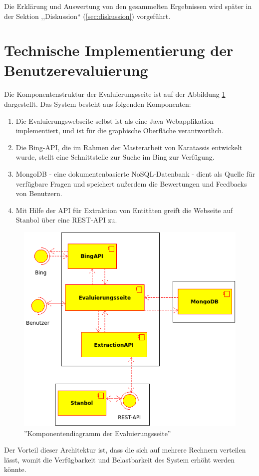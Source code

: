 Die Erklärung und Auswertung von den gesammelten Ergebnissen wird später in der Sektion ,,Diskussion`` (\ref{sec:diskussion}) vorgeführt. 

\section{Technische Implementierung der Benutzerevaluierung}
\paragraph{}
Die Komponentenstruktur der Evaluierungsseite ist auf der Abbildung \ref{fig:evalcomponents} dargestellt. Das System besteht aus folgenden Komponenten:
\begin{enumerate}
\item Die Evaluierungswebseite selbst ist als eine Java-Webapplikation implementiert, und ist für die graphische Oberfläche verantwortlich.
\item Die Bing-API, die im Rahmen der Masterarbeit von Karatassis\cite{Karatassis:15} entwickelt wurde, stellt eine Schnittstelle zur Suche im Bing zur Verfügung.
\item MongoDB - eine dokumentenbasierte NoSQL-Datenbank - dient als Quelle für verfügbare Fragen und speichert außerdem die Bewertungen und Feedbacks von Benutzern.
\item Mit Hilfe der API für Extraktion von Entitäten greift die Webseite auf Stanbol über eine REST-API zu. 
\end{enumerate}

\begin{figure}
\centering
\includegraphics[width=1\textwidth]{Bilder/evaluation_components.png}
\caption{''Komponentendiagramm der Evaluierungsseite''}
\label{fig:evalcomponents}
\end{figure}
Der Vorteil dieser Architektur ist, dass die sich auf mehrere Rechnern verteilen lässt, womit die Verfügbarkeit und Belastbarkeit des System erhöht werden könnte.

